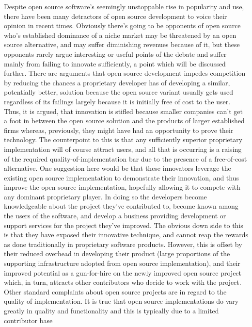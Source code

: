 \documentclass[a4paper,11pt]{article}
\begin{document}
Despite open source software’s seemingly unstoppable rise in popularity and
use, there have been many detractors of open source development to voice their
opinion in recent times. Obviously there’s going to be opponents of open source
who’s established dominance of a niche market may be threatened by an open source
alternative, and may suffer diminishing revenues because of it, but these opponents
rarely argue interesting or useful points of the debate and suffer mainly from failing
to innovate sufficiently, a point which will be discussed further.
There are arguments that open source development impedes competition by reducing
the chances a proprietary developer has of developing a similar, potentially
better, solution because the open source variant usually gets used regardless of its
failings largely because it is initially free of cost to the user. Thus, it is argued, that
innovation is stifled because smaller companies can’t get a foot in between the open
source solution and the products of larger established firms whereas, previously, they
might have had an opportunity to prove their technology. The counterpoint to this
is that any sufficiently superior proprietary implementation will of course attract
users, and all that is occurring is a raising of the required quality-of-implementation
bar due to the presence of a free-of-cost alternative. One suggestion here would be
that these innovators leverage the existing open source implementation to demonstrate
their innovation, and thus improve the open source implementation, hopefully
allowing it to compete with any dominant proprietary player. In doing so the developers
become knowledgeable about the project they’ve contributed to, become
known among the users of the software, and develop a business providing development
or support services for the project they’ve improved. The obvious down side
to this is that they have exposed their innovative technique, and cannot reap the
rewards as done traditionally in proprietary software products. However, this is
offset by their reduced overhead in developing their product (large proportions of
the supporting infrastructure adopted from open source implementation), and their
improved potential as a gun-for-hire on the newly improved open source project
which, in turn, attracts other contributors who decide to work with the project.
Other standard complaints about open source projects are in regard to the quality
of implementation. It is true that open source implementations do vary greatly
in quality and functionality and this is typically due to a limited contributor base
\end{document}
